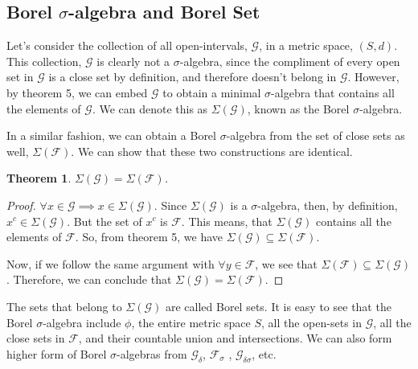 \documentclass{report}
\theoremstyle{plain}
\newtheorem{theorem}{Theorem}[chapter] %
\theoremstyle{definition}
\begin{document}
\subsection{Borel $\sigma$-algebra and Borel Set}
Let's consider the collection of all open-intervals, $\mathcal{G}$, in a metric space, $(S, d)$. This collection, $\mathcal{G}$ is clearly not a $\sigma$-algebra, since the compliment of every open set in $\mathcal{G}$ is a close set by definition, and therefore doesn't belong in $\mathcal{G}$. However, by theorem 5, we can embed $\mathcal{G}$ to obtain a minimal $\sigma$-algebra that contains all the elements of $\mathcal{G}$. We can denote this as $\Sigma(\mathcal{G})$, known as the Borel $\sigma$-algebra.

In a similar fashion, we can obtain a Borel $\sigma$-algebra from the set of close sets as well, $\Sigma(\mathcal{F})$. We can show that these two constructions are identical.
\begin{theorem}
$\Sigma(\mathcal{G})=\Sigma(\mathcal{F})$.
\end{theorem}
\begin{proof}
$\forall x\in\mathcal{G}\implies x\in\Sigma(\mathcal{G})$. Since $\Sigma(\mathcal{G})$ is a $\sigma$-algebra, then, by definition, $x^c\in\Sigma(\mathcal{G})$. But the set of $x^c$ is $\mathcal{F}$. This means, that $\Sigma(\mathcal{G})$ contains all the elements of $\mathcal{F}$. So, from theorem 5, we have $\Sigma(\mathcal{G})\subseteq \Sigma(\mathcal{F})$.

Now, if we follow the same argument with $\forall y\in \mathcal{F}$, we see that $\Sigma(\mathcal{F})\subseteq \Sigma(\mathcal{G})$. Therefore, we can conclude that $\Sigma(\mathcal{G})=\Sigma(\mathcal{F})$.
\end{proof}
\noindent The sets that belong to $\Sigma(\mathcal{G})$ are called Borel sets. It is easy to see that the Borel $\sigma$-algebra include $\phi$, the entire metric space $S$, all the open-sets in $\mathcal{G}$, all the close sets in $\mathcal{F}$, and their countable union and intersections. We can also form higher form of Borel $\sigma$-algebras from $\mathcal{G}_\delta$, $\mathcal{F}_\sigma$ , $\mathcal{G}_{\delta\sigma}$, etc.
\end{document}
